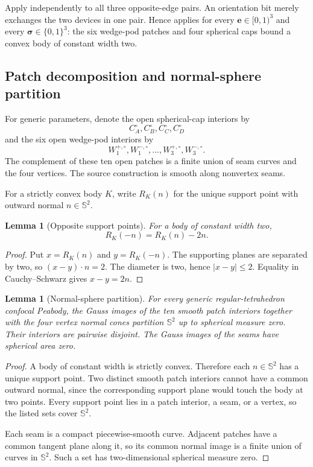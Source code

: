 \documentclass[11pt]{article}
\numberwithin{equation}{section}
\newtheorem{lemma}[theorem]{Lemma}
\theoremstyle{remark}
\newcommand{\Sph}{\mathbb{S}^{2}}
\begin{document}
Apply  independently to all three opposite-edge pairs.  An orientation bit merely exchanges the two devices in one pair.  Hence \cite[Theorem~4.5]{ArelioMontejanoOliveros2023} applies for every \(\mathbf e\in[0,1)^3\) and every \(\boldsymbol\sigma\in\{0,1\}^3\): the six wedge-pod patches and four spherical caps bound a convex body of constant width two.

\subsection{Patch decomposition and normal-sphere partition}

For generic parameters, denote the open spherical-cap interiors by
\[
  C_A^\circ,C_B^\circ,C_C^\circ,C_D^\circ
\]
and the six open wedge-pod interiors by
\[
  W_1^{+,\circ},W_1^{-,\circ},\ldots,W_3^{+,\circ},W_3^{-,\circ}.
\]
The complement of these ten open patches is a finite union of seam curves and the four vertices.  The source construction is smooth along nonvertex seams.

For a strictly convex body \(K\), write \(R_K(n)\) for the unique support point with outward normal \(n\in\Sph\).

\begin{lemma}[Opposite support points]
\label{lem:opposite}
For a body of constant width two,
\begin{equation}
  R_K(-n)=R_K(n)-2n.
  \label{eq:opposite-support}
\end{equation}
\end{lemma}

\begin{proof}
Put \(x=R_K(n)\) and \(y=R_K(-n)\).  The supporting planes are separated by two, so \((x-y)\cdot n=2\).  The diameter is two, hence \(|x-y|\le2\).  Equality in Cauchy--Schwarz gives \(x-y=2n\).
\end{proof}

\begin{lemma}[Normal-sphere partition]
\label{lem:normal-partition}
For every generic regular-tetrahedron confocal Peabody, the Gauss images of the ten smooth patch interiors together with the four vertex normal cones partition \(\Sph\) up to spherical measure zero.  Their interiors are pairwise disjoint.  The Gauss images of the seams have spherical area zero.
\end{lemma}

\begin{proof}
A body of constant width is strictly convex.  Therefore each \(n\in\Sph\) has a unique support point.  Two distinct smooth patch interiors cannot have a common outward normal, since the corresponding support plane would touch the body at two points.  Every support point lies in a patch interior, a seam, or a vertex, so the listed sets cover \(\Sph\).

Each seam is a compact piecewise-smooth curve.  Adjacent patches have a common tangent plane along it, so its common normal image is a finite union of curves in \(\Sph\).  Such a set has two-dimensional spherical measure zero.
\end{proof}
\end{document}

